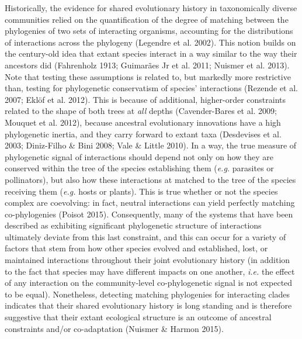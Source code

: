 \documentclass[11pt,serif]{article}
\begin{document}
Historically, the evidence for shared evolutionary history in
taxonomically diverse communities relied on the quantification of the
degree of matching between the phylogenies of two sets of interacting
organisms, accounting for the distributions of interactions across the
phylogeny (Legendre et al. 2002). This notion builds on the century-old
idea that extant species interact in a way similar to the way their
ancestors did (Fahrenholz 1913; Guimarães Jr et al. 2011; Nuismer et al.
2013). Note that testing these assumptions is related to, but markedly
more restrictive than, testing for phylogenetic conservatism of species'
interactions (Rezende et al. 2007; Eklöf et al. 2012). This is because
of additional, higher-order constraints related to the shape of both
trees at \emph{all} depths (Cavender-Bares et al. 2009; Mouquet et al.
2012), because ancestral evolutionary innovations have a high
phylogenetic inertia, and they carry forward to extant taxa (Desdevises
et al. 2003; Diniz-Filho \& Bini 2008; Vale \& Little 2010). In a way,
the true measure of phylogenetic signal of interactions should depend
not only on how they are conserved within the tree of the species
establishing them (\emph{e.g.} parasites or pollinators), but also how
these interactions at matched to the tree of the species receiving them
(\emph{e.g.} hosts or plants). This is true whether or not the species
complex are coevolving: in fact, neutral interactions can yield
perfectly matching co-phylogenies (Poisot 2015). Consequently, many of
the systems that have been described as exhibiting significant
phylogenetic structure of interactions ultimately deviate from this last
constraint, and this can occur for a variety of factors that stem from
how other species evolved and established, lost, or maintained
interactions throughout their joint evolutionary history (in addition to
the fact that species may have different impacts on one another,
\emph{i.e.} the effect of any interaction on the community-level
co-phylogenetic signal is not expected to be equal). Nonetheless,
detecting matching phylogenies for interacting clades indicates that
their shared evolutionary history is long standing and is therefore
suggestive that their extant ecological structure is an outcome of
ancestral constraints and/or co-adaptation (Nuismer \& Harmon 2015).
\end{document}
